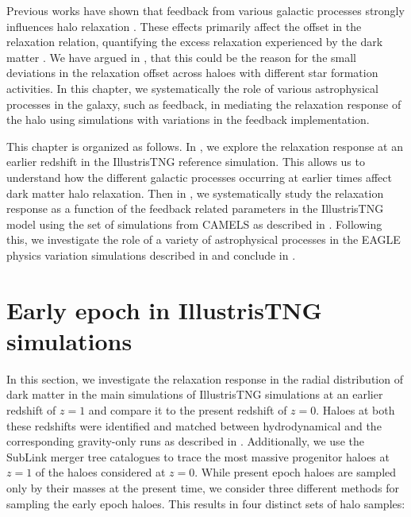 Previous works have shown that feedback from various galactic processes strongly influences halo relaxation \citep{2011MNRAS.414..195T}. These effects primarily affect the offset in the relaxation relation, quantifying the excess relaxation experienced by the dark matter \citep{2023Velmani&Paranjape}. We have argued in , that this could be the reason for the small deviations in the relaxation offset across haloes with different star formation activities. In this chapter, we systematically the role of various astrophysical processes in the galaxy, such as feedback, in mediating the relaxation response of the halo using simulations with variations in the feedback implementation.

This chapter is organized as follows. In , we explore the relaxation response at an earlier redshift in the IllustrisTNG reference simulation. This allows us to understand how the different galactic processes occurring at earlier times affect dark matter halo relaxation. Then in , we systematically study the relaxation response as a function of the feedback related parameters in the IllustrisTNG model using the set of simulations from CAMELS as described in . 
Following this, we investigate the role of a variety of astrophysical processes in the EAGLE physics variation simulations described in  and conclude in .

\section{Early epoch in IllustrisTNG simulations}
\label{sec:res-itng-z01}

In this section, we investigate the relaxation response in the radial distribution of dark matter in the main simulations of IllustrisTNG simulations at an earlier redshift of $z = 1$ and compare it to the present redshift of $z = 0$. Haloes at both these redshifts were identified and matched between hydrodynamical and the corresponding gravity-only runs as described in . Additionally, we use the SubLink merger tree catalogues to trace the most massive progenitor haloes at $z=1$ of the haloes considered at $z=0$. While present epoch haloes are sampled only by their masses at the present time, we consider three different methods for sampling the early epoch haloes. This results in four distinct sets of halo samples:

